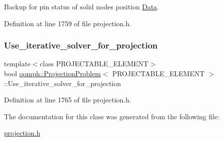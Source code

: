 Backup for pin status of solid node\textquotesingle{}s position \hyperlink{classoomph_1_1Data}{Data}. 



Definition at line 1759 of file projection.\+h.

\mbox{\label{classoomph_1_1ProjectionProblem_a917be524f0312bcf05c399d7c05f95a5}} 
\subsubsection{\texorpdfstring{Use\+\_\+iterative\+\_\+solver\+\_\+for\+\_\+projection}{Use\_iterative\_solver\_for\_projection}}
{\footnotesize\ttfamily template$<$class P\+R\+O\+J\+E\+C\+T\+A\+B\+L\+E\+\_\+\+E\+L\+E\+M\+E\+NT$>$ \\
bool \hyperlink{classoomph_1_1ProjectionProblem}{oomph\+::\+Projection\+Problem}$<$ P\+R\+O\+J\+E\+C\+T\+A\+B\+L\+E\+\_\+\+E\+L\+E\+M\+E\+NT $>$\+::Use\+\_\+iterative\+\_\+solver\+\_\+for\+\_\+projection\hspace{0.3cm}{\ttfamily [private]}}



Definition at line 1765 of file projection.\+h.



The documentation for this class was generated from the following file\+:\begin{DoxyCompactItemize}
\item 
\hyperlink{projection_8h}{projection.\+h}\end{DoxyCompactItemize}
